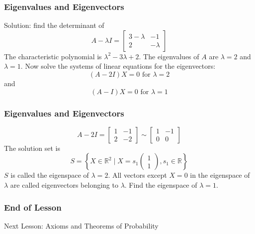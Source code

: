 \documentclass[xcolor=dvipsnames]{beamer}
\begin{document}
\begin{frame}
  \frametitle{Eigenvalues and Eigenvectors}
  Solution: find the determinant of
  \begin{equation}
    \label{eq:aeboapai}
    A-\lambda{}I=\left[
      \begin{array}{cc}
        3-\lambda&-1\\
        2&-\lambda
      \end{array}\right]
  \end{equation}
The characteristic polynomial is $\lambda^{2}-3\lambda+2$. The
eigenvalues of $A$ are $\lambda=2$ and $\lambda=1$. Now solve the
systems of linear equations for the eigenvectors:
\begin{equation}
  \label{eq:ahquaiwi}
  (A-2I)X=0\mbox{ for }\lambda=2
\end{equation}
and
\begin{equation}
  \label{eq:eetoodai}
  (A-I)X=0\mbox{ for }\lambda=1
\end{equation}
\end{frame}

\begin{frame}
  \frametitle{Eigenvalues and Eigenvectors}
  \begin{equation}
    \label{eq:jaegheed}
    A-2I=\left[
      \begin{array}{cc}
        1&-1\\
        2&-2
      \end{array}\right]\sim\left[
      \begin{array}{cc}
        1&-1\\
        0&0
      \end{array}\right]
  \end{equation}
  The solution set is
  \begin{equation}
    \label{eq:enahvodo}
S=\left\{X\in\mathbb{R}^{2}\;|\;X=s_{1}\left(
    \begin{array}{c}
      1\\
      1
    \end{array}\right),s_{1}\in\mathbb{R}\right\}
\end{equation}
$S$ is called the \alert{eigenspace} of $\lambda=2$. All vectors
except $X=0$ in the eigenspace of $\lambda$ are called eigenvectors
belonging to $\lambda$. Find the eigenspace of $\lambda=1$.
\end{frame}

\begin{frame}
  \frametitle{End of Lesson}
Next Lesson: Axioms and Theorems of Probability
\end{frame}
\end{document}
